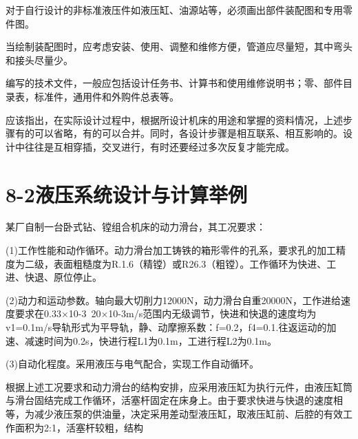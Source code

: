  对于自行设计的非标准液压件如液压缸、油源站等，必须画出部件装配图和专用零件图。

 当绘制装配图时，应考虑安装、使用、调整和维修方便，管道应尽量短，其中弯头和接头尽量少。

 编写的技术文件，一般应包括设计任务书、计算书和使用维修说明书；零、部件目录表，标准件，通用件和外购件总表等。

 应该指出，在实际设计过程中，根据所设计机床的用途和掌握的资料情况，上述步骤有的可以省略，有的可以合并。同时，各设计步骤是相互联系、相互影响的。设计中往往是互相穿插，交叉进行，有时还要经过多次反复才能完成。


\section{8-2\quad 液压系统设计与计算举例}

某厂自制一台卧式钻、镗组合机床的动力滑台，其工况要求：

(1)工作性能和动作循环。动力滑台加工铸铁的箱形零件的孔系，要求孔的加工精度为二级，表面粗糙度为R.1.6（精镗）或R26.3（粗镗）。工作循环为快进、工进、快退、原位停止。

(2)动力和运动参数。轴向最大切削力12000N，动力滑台自重20000N，工作进给速度要求在0.33×10-3~20×10-3m/s范围内无级调节，快进和快退的速度均为v1=0.1m/s导轨形式为平导轨，静、动摩擦系数：f=0.2，f4=0.1.往返运动的加速、减速时间为0.2s，快进行程L1为0.1m，工进行程L2为0.1m。

(3)自动化程度。采用液压与电气配合，实现工作自动循环。

根据上述工况要求和动力滑台的结构安排，应采用液压缸为执行元件，由液压缸筒与滑台固结完成工作循环，活塞杆固定在床身上。由于要求快进与快退的速度相等，为减少液压泵的供油量，决定采用差动型液压缸，取液压缸前、后腔的有效工作面积为2:1，活塞杆较粗，结构